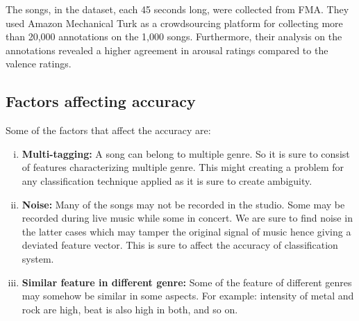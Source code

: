 The songs, in the dataset, each 45 seconds long, were collected from FMA. They used Amazon Mechanical Turk as a crowdsourcing platform for collecting more than 20,000 annotations on the 1,000 songs. 
Furthermore, their analysis on the annotations revealed a higher agreement in arousal ratings compared to the valence ratings.

\subsection{Factors affecting accuracy}
Some of the factors that affect the accuracy are: 
\begin{enumerate}[(i)] 
        \item \textbf{Multi-tagging:} A song can belong to multiple genre. So it is sure to consist of features characterizing multiple genre. This might creating a
                problem for any classification technique applied as it is sure to create ambiguity. 
        \item \textbf{Noise:} Many of the songs may not be recorded in the studio. Some may be recorded during live music while some in concert. We are sure to find
                noise in the latter cases which may tamper the original signal of music hence giving a deviated feature vector. This is sure to affect the accuracy of classification system.
        \item \textbf{Similar feature in different genre:} Some of the feature of different genres may somehow be similar in some aspects. For example: intensity of metal
                and rock are high, beat is also high in both, and so on. 
\end{enumerate}

